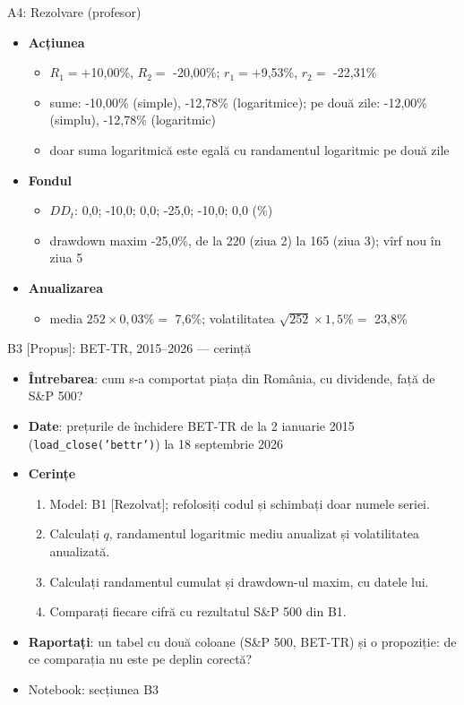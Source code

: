 \ifsolutions
\begin{frame}{A4: Rezolvare (profesor)}
\itemsize{\small}
\begin{itemize}
    \item \textbf{Acțiunea}
    \begin{itemize}
        \item $R_1 = +$10{,}00\%, $R_2 = $ -20{,}00\%; $r_1 = +$9{,}53\%, $r_2 = $ -22{,}31\%
        \item sume: -10{,}00\% (simple), -12{,}78\% (logaritmice); pe două zile: -12{,}00\% (simplu), -12{,}78\% (logaritmic)
        \item doar suma logaritmică este egală cu randamentul logaritmic pe două zile
    \end{itemize}
    \item \textbf{Fondul}
    \begin{itemize}
        \item $DD_t$: 0{,}0; -10{,}0; 0{,}0; -25{,}0; -10{,}0; 0{,}0 (\%)
        \item drawdown maxim -25{,}0\%, de la 220 (ziua 2) la 165 (ziua 3); vîrf nou în ziua 5
    \end{itemize}
    \item \textbf{Anualizarea}
    \begin{itemize}
        \item media $252 \times 0{,}03\% = $ 7{,}6\%; volatilitatea $\sqrt{252} \times 1{,}5\% = $ 23{,}8\%
    \end{itemize}
\end{itemize}
\end{frame}
\fi

\begin{frame}{B3 [Propus]: BET-TR, 2015--2026 --- cerință}
\itemsize{\small}
\begin{itemize}
\item \textbf{Întrebarea}: cum s-a comportat piața din România, cu dividende, față de S\&P 500?
\item \textbf{Date}: prețurile de închidere BET-TR de la 2 ianuarie 2015 (\texttt{load\_close('bettr')}) la 18 septembrie 2026
\item \textbf{Cerințe}
\begin{enumerate}
    \item Model: B1 [Rezolvat]; refolosiți codul și schimbați doar numele seriei.
    \item Calculați $q$, randamentul logaritmic mediu anualizat și volatilitatea anualizată.
    \item Calculați randamentul cumulat și drawdown-ul maxim, cu datele lui.
    \item Comparați fiecare cifră cu rezultatul S\&P 500 din B1.
\end{enumerate}
\item \textbf{Raportați}: un tabel cu două coloane (S\&P 500, BET-TR) și o propoziție: de ce comparația nu este pe deplin corectă?
\item Notebook: secțiunea B3
\end{itemize}
\end{frame}

